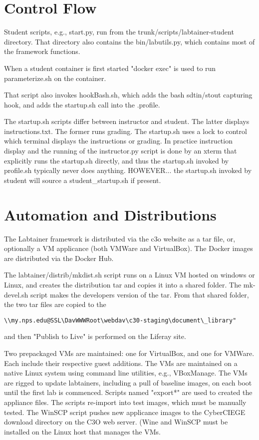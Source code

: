 \documentclass[12pt]{article}
\begin{document}
\section {Control Flow}
Student scripts, e.g., start.py, run from the trunk/scripts/labtainer-student directory.
That directory also contains the bin/labutils.py, which contains most of the framework
functions.

When a student container is first started "docker exec" is used
to run parameterize.sh on the container.

That script also invokes hookBash.sh, which adds the bash
sdtin/stout capturing hook, and adds the startup.sh call
into the .profile.

The startup.sh scripts differ between instructor and student.  The latter
displays instructions.txt.  The former runs grading.
The startup.sh uses a lock to control which
terminal displays the instructions or grading.  In practice instruction
display and the running of the instructor.py script is done by
an xterm that explicitly runs the startup.sh directly, and thus
the startup.sh invoked by profile.sh typically never does anything.
HOWEVER... the startup.sh invoked by student will source a student\_startup.sh if present.

\section{Automation and Distributions}
The Labtainer framework is distributed via the c3o website as a tar file, or, optionally a
VM applicance (both VMWare and VirtualBox).  The Docker images are distributed via the Docker Hub.

The labtainer/distrib/mkdist.sh script runs on a Linux VM hosted on windows or Linux, and creates the distribution tar 
and copies it into a shared folder.  The mk-devel.sh script makes the developers version of the tar.
From that shared folder, the two tar files are copied to the 
\begin{verbatim}
\\my.nps.edu@SSL\DavWWWRoot\webdav\c30-staging\document\_library" 
\end{verbatim}
\noindent and then "Publish to Live" is 
performed on the Liferay site.

Two prepackaged VMs are maintained: one for VirtualBox, and one for VMWare.  Each include
their respective guest additions.  The VMs are maintained on a native Linux system using command line
utilities, e.g., VBoxManage.  The VMs are rigged to update labtainers, including a pull of
baseline images, on each boot until the first lab is commenced.  Scripts named "export*" are
used to created the appliance files.  The scripts re-import into test images, which must be
manually tested.  The WinSCP script pushes new applicance images to the CyberCIEGE download
directory on the C3O web server.  (Wine and WinSCP must be installed on the Linux host that
manages the VMs.
\end{document}
